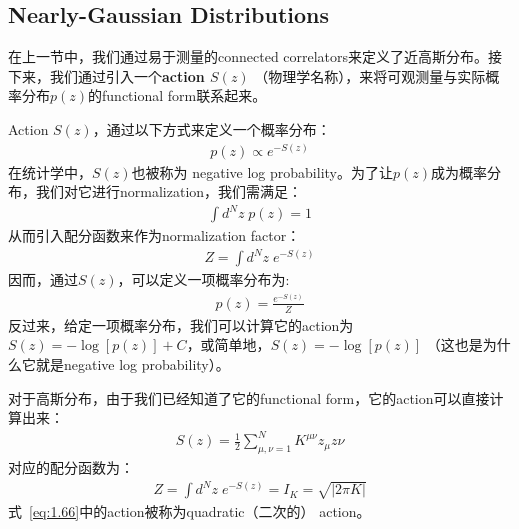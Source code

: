 \subsection{Nearly-Gaussian Distributions}
在上一节中，我们通过易于测量的connected correlators来定义了近高斯分布。接下来，我们通过引入一个\textbf{action $S(z)$} （物理学名称），来将可观测量与实际概率分布$p(z)$的functional form联系起来。

Action $S(z)$，通过以下方式来定义一个概率分布：
\begin{equation}
    \begin{split}
        p(z) \varpropto e^{-S(z)}
    \end{split}
\end{equation}
在统计学中，$S(z)$也被称为 negative log probability。为了让$p(z)$成为概率分布，我们对它进行normalization，我们需满足：
\begin{equation}
    \begin{split}
        \int d^N\!z\;p(z) =1
    \end{split}
\end{equation}
从而引入配分函数来作为normalization factor：%
\begin{equation}
    \begin{split}
        Z = \int d^N\!z\;e^{-S(z)}
    \end{split}
\end{equation}
因而，通过$S(z)$，可以定义一项概率分布为:
\begin{equation}
    \begin{split}
        p(z) = \frac{e^{-S(z)}}{Z}
    \end{split}
\end{equation}
反过来，给定一项概率分布，我们可以计算它的action为$S(z) = -\log[p(z)] + C$，或简单地，$S(z) = -\log[p(z)]$ （这也是为什么它就是negative log probability）。

对于高斯分布，由于我们已经知道了它的functional form，它的action可以直接计算出来：
\begin{equation}
    \begin{split}
        \label{eq:1.66}
        S(z) = \frac{1}{2} \sum_{\mu,\nu=1}^N K^{\mu\nu}z_\mu z\nu
    \end{split}
\end{equation}
对应的配分函数为：
\begin{equation}
    \begin{split}
        Z = \int d^N\!z\;e^{-S(z)} = I_K = \sqrt{|2\pi K|}
    \end{split}
\end{equation}
式~\eqref{eq:1.66}中的action被称为quadratic（二次的） action。

